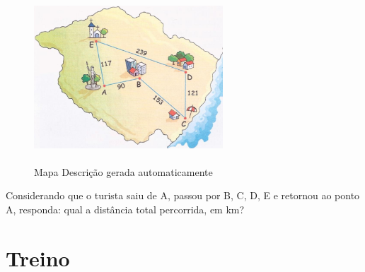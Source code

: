 \begin{escolha}
\begin{boxmedio}
\begin{boxmedio}
{\begin{boxpeq}
\begin{boxpeq}
{\begin{boxpeq}
\begin{boxmedio}
\begin{boxmedio}
\begin{boxpeq}
\begin{boxmedio}
\begin{boxpeq}
\begin{boxpeq}
\begin{boxpeq}
\begin{boxpeq}
\begin{boxmedio}
{\begin{boxmedio}
\begin{boxmedio}
\begin{boxpeq}
\begin{boxmedio}
\begin{boxpeq}
\begin{boxpeq}
\begin{boxpeq}
\begin{escolha}
{\begin{boxmedio}
\begin{boxpeq}
\begin{boxpeq}
\begin{boxpeq}
\begin{boxpeq}
\begin{boxpeq}
\begin{boxmedio}
\begin{boxpeq}
\begin{boxpeq}
\begin{boxpeq}
{\begin{boxpeq}
\begin{boxmedio}
\begin{boxpeq}
\begin{boxpeq}
\begin{boxpeq}
{\begin{boxpeq}
\begin{boxmedio}
{\begin{boxpeq}
\begin{boxpeq}
\begin{boxmedio}
\begin{boxmedio}
\begin{boxpeq}
\begin{boxpeq}
{\begin{boxpeq}
\begin{boxpeq}
\begin{boxpeq}
\begin{boxpeq}
\begin{boxpeq}
\begin{escolha}
\begin{escolha}
{\begin{boxmedio}
\begin{boxpeq}
\begin{q°}
\begin{boxmedio}
\begin{boxpeq}
\begin{boxpeq}
\begin{boxmedio}
\begin{boxmedio}
\begin{boxmedio}
\begin{figure}
\centering
\includegraphics[width=2.77778in,height=2.5in]{./_SAEB_9_MAT/media/image210.png}
\caption{Mapa Descrição gerada automaticamente}
\end{figure}


Considerando que o turista saiu de A, passou por B, C, D, E e retornou ao ponto A,
responda: qual a distância total percorrida, em km?


\section{Treino}


\end{boxmedio}
\end{boxmedio}
\end{boxmedio}
\end{boxpeq}
\end{boxpeq}
\end{boxmedio}
\end{q°}
\end{boxpeq}
\end{boxmedio}}
\end{escolha}
\end{escolha}
\end{boxpeq}
\end{boxpeq}
\end{boxpeq}
\end{boxpeq}
\end{boxpeq}}
\end{boxpeq}
\end{boxpeq}
\end{boxmedio}
\end{boxmedio}
\end{boxpeq}
\end{boxpeq}}
\end{boxmedio}
\end{boxpeq}}
\end{boxpeq}
\end{boxpeq}
\end{boxpeq}
\end{boxmedio}
\end{boxpeq}}
\end{boxpeq}
\end{boxpeq}
\end{boxpeq}
\end{boxmedio}
\end{boxpeq}
\end{boxpeq}
\end{boxpeq}
\end{boxpeq}
\end{boxpeq}
\end{boxmedio}}
\end{escolha}
\end{boxpeq}
\end{boxpeq}
\end{boxpeq}
\end{boxmedio}
\end{boxpeq}
\end{boxmedio}
\end{boxmedio}}
\end{boxmedio}
\end{boxpeq}
\end{boxpeq}
\end{boxpeq}
\end{boxpeq}
\end{boxmedio}
\end{boxpeq}
\end{boxmedio}
\end{boxmedio}
\end{boxpeq}}
\end{boxpeq}
\end{boxpeq}}
\end{boxmedio}
\end{boxmedio}
\end{escolha}
